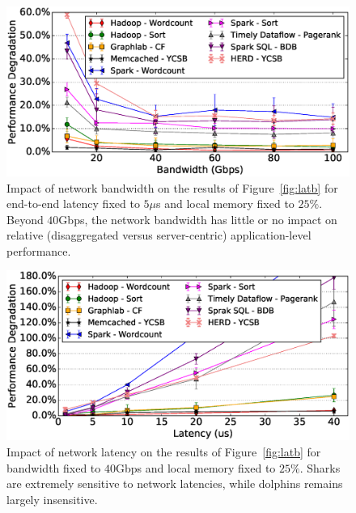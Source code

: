 
%
\begin{figure}[t]
  \centering
    \includegraphics[width = \columnwidth]{img/fix_latency_vary_bw.eps} 
  \caption{\small{Impact of network bandwidth on the results of Figure~\ref{fig:latb} for end-to-end latency fixed to $5\mu$s and local memory fixed to $25\%$. Beyond $40$Gbps, the network bandwidth has little or no impact on relative (disaggregated versus server-centric) application-level performance.}}
  \label{fig:impbw}
\end{figure}
%
%
\begin{figure}[t]
  \centering
    \includegraphics[width=\columnwidth]{img/fix_bw_vary_latency.eps} 
  \caption{\small{Impact of network latency on the results of Figure~\ref{fig:latb} for bandwidth fixed to $40$Gbps and local memory fixed to $25\%$. Sharks are extremely sensitive to network latencies, while dolphins remains largely insensitive.}}
  \label{fig:impl}
\end{figure}
%
%
